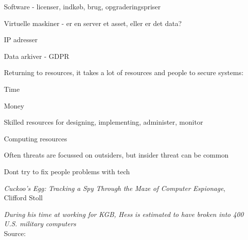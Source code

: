 \documentclass[Screen16to9,17pt]{foils}
\begin{document}

\begin{list2}
\item Software - licenser, indkøb, brug, opgraderingspriser
\item Virtuelle maskiner - er en server et asset, eller er det data?
\item IP adresser
\item Data arkiver - GDPR
\end{list2}




\begin{list1}
\item Returning to resources, it takes a lot of resources and people to secure systems:
\begin{list2}
\item Time
\item Money
\item Skilled resources for designing, implementing, administer, monitor
\item Computing resources
\end{list2}
\item Often threats are focussed on outsiders, but insider threat can be common
\item Dont try to fix people problems with tech
\end{list1}


\begin{list1}
\item
\emph{Cuckoo's Egg: Tracking a Spy Through the Maze of Computer
 Espionage},\\  Clifford Stoll
\item \emph{During his time at working for KGB, Hess is estimated to have broken into 400 U.S. military computers}\\
Source: 
\end{list1}




\end{document}
